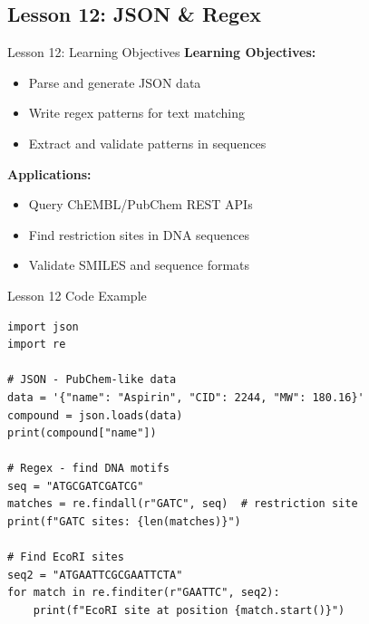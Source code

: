 \documentclass{beamer}
\begin{document}
\subsection{Lesson 12: JSON \& Regex}

\begin{frame}{Lesson 12: Learning Objectives}
    \small
    \textbf{Learning Objectives:}
    \begin{itemize}
        \item Parse and generate JSON data
        \item Write regex patterns for text matching
        \item Extract and validate patterns in sequences
    \end{itemize}
    \vspace{0.5em}
    \textbf{Applications:}
    \begin{itemize}
        \item Query ChEMBL/PubChem REST APIs
        \item Find restriction sites in DNA sequences
        \item Validate SMILES and sequence formats
    \end{itemize}
\end{frame}

\begin{frame}[fragile]{Lesson 12 Code Example}
    \small
    \begin{lstlisting}[style=codeStyle]
import json
import re

# JSON - PubChem-like data
data = '{"name": "Aspirin", "CID": 2244, "MW": 180.16}'
compound = json.loads(data)
print(compound["name"])

# Regex - find DNA motifs
seq = "ATGCGATCGATCG"
matches = re.findall(r"GATC", seq)  # restriction site
print(f"GATC sites: {len(matches)}")

# Find EcoRI sites
seq2 = "ATGAATTCGCGAATTCTA"
for match in re.finditer(r"GAATTC", seq2):
    print(f"EcoRI site at position {match.start()}")
    \end{lstlisting}
\end{frame}
\end{document}
